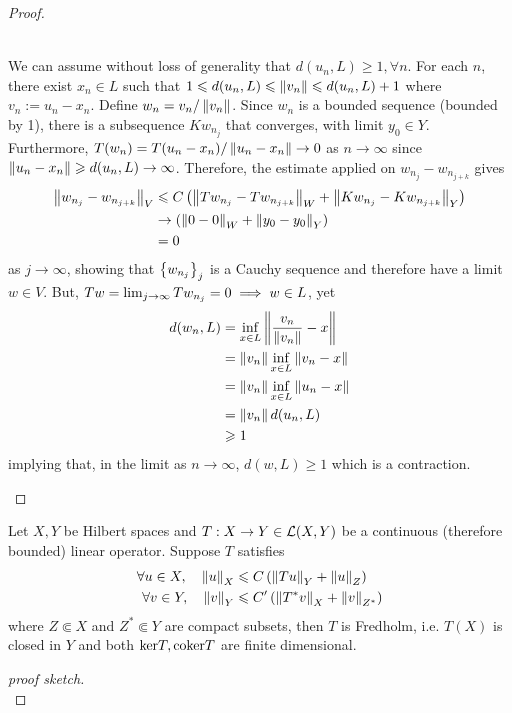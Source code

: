 \documentclass[12pt]{article}
\begin{document}
\begin{proof}
    \begin{case} \hfill \\
        We can assume without loss of generality that $d(u_n, L) \geq 1, \forall n$. For each $n$, there exist $x_n \in L$ such that $1 \leq d(u_n, L) \leq \norm[v_n] \leq d(u_n, L) + 1$ where $v_n := u_n - x_n$. Define $w_n = v_n / \norm[v_n]$. Since $w_n$ is a bounded sequence (bounded by 1), there is a subsequence $Kw_{n_j}$ that converges, with limit $y_0 \in Y$. Furthermore, $T(w_n) = T(u_n - x_n) / \norm[u_n - x_n] \to 0$ as $n \to \infty$ since $\norm[u_n - x_n] \geq d(u_n, L) \to \infty$. Therefore, the estimate applied on $w_{n_j} - w_{n_{j + k}}$ gives
        \begin{align*}
        \norm[w_{n_j} - w_{n_{j + k}}]_V
        & \leq C \brac{\norm[Tw_{n_j} - Tw_{n_{j + k}}]_W + \norm[Kw_{n_j} - Kw_{n_{j + k}}]_Y} \\
        & \to  \brac{\norm[0 - 0]_W + \norm[y_0 - y_0]_Y} \\
        & = 0 
        \end{align*}
        as $j \to \infty$, showing that $\set{w_{n_j}}_j$ is a Cauchy sequence and therefore have a limit $w \in V$. But, $Tw = \Lim[j] Tw_{n_j} = 0 \implies w \in L$, yet 
        \begin{align*}
        d(w_n, L) 
        &= \inf_{x \in L} \norm[\frac{v_n}{\norm[v_n]} - x] \\
        &= \norm[v_n] \inf_{x \in L} \norm[v_n - x] \\
        &= \norm[v_n] \inf_{x \in L} \norm[u_n - x] \\
        &= \norm[v_n] d(u_n, L) \\
        &\geq 1
        \end{align*}
        implying that, in the limit as $n \to \infty$, $d(w, L) \geq 1$ which is a contraction. 
    \end{case}
\end{proof}

\begin{ftheorem}
    Let $X, Y$ be Hilbert spaces and $T: X \to Y \in \L(X, Y)$ be a continuous (therefore bounded) linear operator. Suppose $T$ satisfies 
    \begin{align*}
        \forall u \in X, \quad \norm[u]_{X} &\leq C \brac{\norm[Tu]_Y + \norm[u]_Z} \\
        \forall v \in Y, \quad \norm[v]_{Y} &\leq C' \brac{\norm[T^*v]_X + \norm[v]_{Z^*}}
    \end{align*}
    where $Z \Subset X$ and $Z^* \Subset Y$ are compact subsets, then $T$ is Fredholm, i.e. $T(X)$ is closed in $Y$ and both $\ker T, \coker T$ are finite dimensional. 
\end{ftheorem}
\begin{proof}[proof sketch] \hfill \\ 
    
    
\end{proof}
\end{document}
